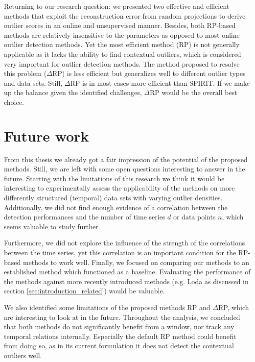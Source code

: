 Returning to our research question: we presented two effective and efficient methods that exploit the reconstruction error from random projections to derive outlier scores in an online and unsupervised manner. Besides, both RP-based methods are relatively insensitive to the parameters as opposed to most online outlier detection methods. Yet the most efficient method (RP) is not generally applicable as it lacks the ability to find contextual outliers, which is considered very important for outlier detection methods. The method proposed to resolve this problem ($\Delta$RP) is less efficient but generalizes well to different outlier types and data sets. Still, $\Delta$RP is in most cases more efficient than SPIRIT. If we make up the balance given the identified challenges, $\Delta$RP would be the overall best choice.


\section{Future work}
\label{sec:discussion_future}

From this thesis we already got a fair impression of the potential of the proposed methods. Still, we are left with some open questions interesting to answer in the future. Starting with the limitations of this research we think it would be interesting to experimentally assess the applicability of the methods on more differently structured (temporal) data sets with varying outlier densities. Additionally, we did not find enough evidence of a correlation between the detection performances and the number of time series $d$ or data points $n$, which seems valuable to study further. 

Furthermore, we did not explore the influence of the strength of the correlations between the time series, yet this correlation is an important condition for the RP-based methods to work well. Finally, we focused on comparing our methods to an established method which functioned as a baseline. Evaluating the performance of the methods against more recently introduced methods (e.g. Loda \cite{pevny2016loda} as discussed in section \ref{sec:introduction_related}) would be valuable.

We also identified some limitations of the proposed methods RP and $\Delta$RP, which are interesting to look at in the future. Throughout the analysis, we concluded that both methods do not significantly benefit from a window, nor track any temporal relations internally. Especially the default RP method could benefit from doing so, as in its current formulation it does not detect the contextual outliers well. 

